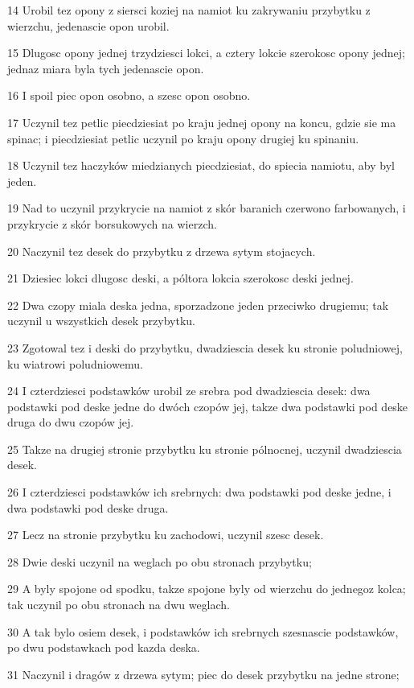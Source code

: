 \par 14 Urobil tez opony z siersci koziej na namiot ku zakrywaniu przybytku z wierzchu, jedenascie opon urobil.
\par 15 Dlugosc opony jednej trzydziesci lokci, a cztery lokcie szerokosc opony jednej; jednaz miara byla tych jedenascie opon.
\par 16 I spoil piec opon osobno, a szesc opon osobno.
\par 17 Uczynil tez petlic piecdziesiat po kraju jednej opony na koncu, gdzie sie ma spinac; i piecdziesiat petlic uczynil po kraju opony drugiej ku spinaniu.
\par 18 Uczynil tez haczyków miedzianych piecdziesiat, do spiecia namiotu, aby byl jeden.
\par 19 Nad to uczynil przykrycie na namiot z skór baranich czerwono farbowanych, i przykrycie z skór borsukowych na wierzch.
\par 20 Naczynil tez desek do przybytku z drzewa sytym stojacych.
\par 21 Dziesiec lokci dlugosc deski, a póltora lokcia szerokosc deski jednej.
\par 22 Dwa czopy miala deska jedna, sporzadzone jeden przeciwko drugiemu; tak uczynil u wszystkich desek przybytku.
\par 23 Zgotowal tez i deski do przybytku, dwadziescia desek ku stronie poludniowej, ku wiatrowi poludniowemu.
\par 24 I czterdziesci podstawków urobil ze srebra pod dwadziescia desek: dwa podstawki pod deske jedne do dwóch czopów jej, takze dwa podstawki pod deske druga do dwu czopów jej.
\par 25 Takze na drugiej stronie przybytku ku stronie pólnocnej, uczynil dwadziescia desek.
\par 26 I czterdziesci podstawków ich srebrnych: dwa podstawki pod deske jedne, i dwa podstawki pod deske druga.
\par 27 Lecz na stronie przybytku ku zachodowi, uczynil szesc desek.
\par 28 Dwie deski uczynil na weglach po obu stronach przybytku;
\par 29 A byly spojone od spodku, takze spojone byly od wierzchu do jednegoz kolca; tak uczynil po obu stronach na dwu weglach.
\par 30 A tak bylo osiem desek, i podstawków ich srebrnych szesnascie podstawków, po dwu podstawkach pod kazda deska.
\par 31 Naczynil i dragów z drzewa sytym; piec do desek przybytku na jedne strone;
